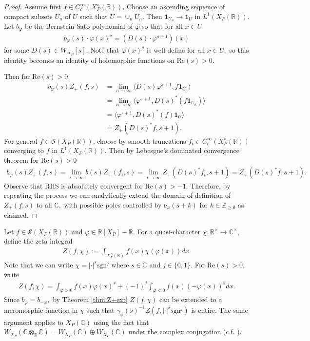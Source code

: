 \documentclass[11pt,a4paper,usenames,dvipsnames,reqno]{amsart}
\numberwithin{equation}{section}
\newcommand{\cc}{\mathbb C}
\newcommand{\zz}{\mathbb Z}
\newcommand{\rr}{\mathbb R}
\theoremstyle{definition}
\theoremstyle{remark}
\begin{document}
\begin{proof}
 Assume first $f\in C^\infty_c(X_P^\circ(\rr)).$ Choose an ascending sequence of compact subsets $U_n$ of $U$ such that $U=\cup _n U_n$. Then $\mathbf{1}_{U_n} \to \mathbf{1}_U$ in $L^1(X_P(\rr))$. Let $b_\varphi$ be the Bernstein-Sato polynomial of $\varphi$ so that for all $x\in U$
 \begin{align*}
     b_\varphi(s) \cdot\varphi(x)^s=(D(s)\cdot\varphi^{s+1})(x)
 \end{align*}
 for some $D(s)\in W_{X_P}[s].$ Note that $\varphi(x)^s$ is well-define for all $x\in U,$ so this identity becomes an identity of holomorphic functions on $\mathrm{Re}(s)>0.$
 
 Then for $\mathrm{Re}(s)>0$
\begin{align*}
    b_{\varphi}(s)Z_+(f,s)&=\lim_{n\to \infty}\langle D(s)\varphi^{s+1} ,f\mathbf{1}_{U_n}\rangle \\
    &=\lim_{n\to \infty}\langle \varphi^{s+1} , D(s)^{\ast}(f\mathbf{1}_{U_n})\rangle \\
    &=\langle \varphi^{s+1}, D(s)^\ast (f)\mathbf{1}_U \rangle \\
    &=Z_+(D(s)^{\ast}f,s+1).
\end{align*}
For general $f\in \mathcal{S}(X_P(\rr))$, choose by smooth truncations $f_i\in C^\infty_c(X_P^\circ(\rr))$ converging to $f$ in $L^1(X_P(\rr)).$ Then by Lebesgue's dominated convergence theorem for $\mathrm{Re}(s)>0$
\begin{align*}
      b_\varphi(s)Z_+(f,s)=\lim_{i\to\infty} b(s)Z_+(f_i,s)=\lim_{i\to\infty} Z_+(D(s)^\ast f_i,s+1)=Z_+(D(s)^\ast f,s+1).
\end{align*}
Observe that RHS is absolutely convergent for $\mathrm{Re}(s)>-1.$ Therefore, by repeating the process  we can analytically extend the domain of definition of $Z_+(f,s)$ to all $\cc,$ with possible poles controlled by $b_\varphi(s+k)$ for $k\in \zz_{\ge 0}$ as claimed.
\end{proof}

Let $f\in \mathcal{S}(X_P(\rr))$ and $\varphi\in \rr[X_P]-\rr.$ For a quasi-character $\chi:\rr^\times\to \cc^\times,$ define the zeta integral
\begin{align*}
    Z(f,\chi):=\int_{X_P^\circ(\rr)} f(x)\chi(\varphi(x)) dx.
\end{align*}
Note that we can write $\chi=|\cdot|^{s}\mathrm{sgn}^j$ where $s\in \cc$ and $j\in \{0,1\}.$ For $\mathrm{Re}(s)>0$, write
\begin{align*}
     Z(f,\chi)=\int_{\varphi>0} f(x)\varphi(x)^s+(-1)^j\int_{\varphi<0} f(x)(-\varphi(x))^sdx.
\end{align*}
Since $b_\varphi=b_{-\varphi},$ by Theorem \ref{thm:Z+ext} $Z(f,\chi)$ can be extended to a meromorphic function in $\chi$ such that $\gamma_\varphi(s)^{-1}Z(f,|\cdot|^s\mathrm{sgn}^j)$ is entire. The same argument applies to $X_P(\cc)$ using the fact that $W_{X_P}(\cc\otimes_\rr\cc)=W_{X_P}(\cc)\oplus \overline{W_{X_P}(\cc)}$ under the complex conjugation (c.f. \cite[pp. 71-73]{Igusa:zeta}).
\end{document}
